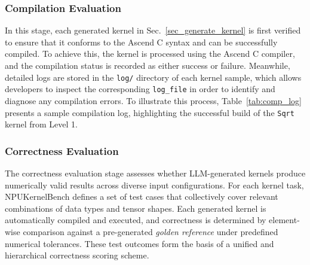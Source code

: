 \subsubsection{Compilation Evaluation}
In this stage, each generated kernel in Sec.~\ref{sec_generate_kernel} is first verified to ensure that it conforms to the Ascend C syntax and can be successfully compiled. To achieve this, the kernel is processed using the Ascend C compiler, and the compilation status is recorded as either success or failure. Meanwhile, detailed logs are stored in the \texttt{log/} directory of each kernel sample, which allows developers to inspect the corresponding \texttt{log\_file} in order to identify and diagnose any compilation errors. To illustrate this process, Table~\ref{tab:comp_log} presents a sample compilation log, highlighting the successful build of the \texttt{Sqrt} kernel from Level 1.




\subsubsection{Correctness Evaluation}\label{kernelbench_correctness}


The correctness evaluation stage assesses whether LLM-generated kernels produce numerically valid results across diverse input configurations. For each kernel task, NPUKernelBench defines a set of test cases that collectively cover relevant combinations of data types and tensor shapes. Each generated kernel is automatically compiled and executed, and correctness is determined by element-wise comparison against a pre-generated \textit{golden reference} under predefined numerical tolerances. These test outcomes form the basis of a unified and hierarchical correctness scoring scheme.

